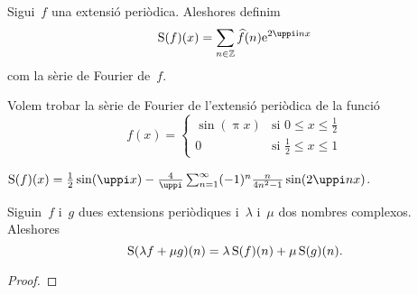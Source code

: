 \documentclass[../../Main.tex]{subfiles}
\begin{document}
	\begin{definition}
		\label{def:sèrie de Fourier}
		Sigui~\(f\) una extensió periòdica.
		Aleshores definim
		\[
		    \sfourier(f)(x)=\sum_{n\in\mathbb{Z}}\widehat{f}(n)\e^{2\uppi\iu nx}
		\]
		com la sèrie de Fourier de~\(f\).
	\end{definition}
	\begin{example}
		\label{ex:trobar una sèrie de Fourier}
		Volem trobar la sèrie de Fourier de l'extensió periòdica de la funció
		\[f(x)=\begin{cases}
			\sin(\uppi x) & \text{si } 0\leq x\leq\frac{1}{2} \\
			0 & \text{si }\frac{1}{2}\leq x\leq 1
		\end{cases}\]
		\begin{solution}
			\(\sfourier(f)(x)=\frac{1}{2}\sin(\uppi x)-\frac{4}{\uppi}\sum_{n=1}^{\infty}(-1)^{n}\frac{n}{4n^{2}-1}\sin(2\uppi nx)\).
		\end{solution}
	\end{example}
	\begin{proposition}
		\label{prop:les sèries de Fourier són lineals}
		Siguin~\(f\) i~\(g\) dues extensions periòdiques i~\(\lambda\) i~\(\mu\) dos nombres complexos.
		Aleshores
		\[
		    \operatorname{S}(\lambda f+\mu g)(n)=\lambda\operatorname{S}(f)(n)+\mu\operatorname{S}(g)(n).
		\]
		\begin{proof}
		\end{proof}
	\end{proposition}
\end{document}
